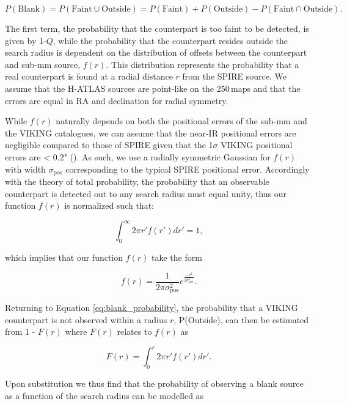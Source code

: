 \begin{equation}
\label{eq:blank_probability}
    P(\textrm{Blank}) = P(\textrm{Faint} \cup \textrm{Outside}) = P(\textrm{Faint}) + P(\textrm{Outside}) - P(\textrm{Faint} \cap \textrm{Outside}).
\end{equation}

The first term, the probability that the counterpart is too faint to be detected, is given by 1-$Q$, while the probability that the counterpart resides outside the search radius is dependent on the distribution of offsets between the counterpart and sub-mm source, $f(r)$. This distribution represents the probability that a real counterpart is found at a radial distance $r$ from the SPIRE source. We assume that the H-ATLAS sources are point-like on the 250\,\micron maps and that the errors are equal in RA and declination for radial symmetry.

While $f(r)$ naturally depends on both the positional errors of the sub-mm and the VIKING catalogues, we can assume that the near-IR positional errors are negligible compared to those of SPIRE given that the 1$\sigma$ VIKING positional errors are < 0.2" (\citealt{Fleuren_2012}). As such, we use a radially symmetric Gaussian for $f(r)$ with width $\sigma_\textrm{pos}$ corresponding to the typical SPIRE positional error. Accordingly with the theory of total probability, the probability that an observable counterpart is detected out to any search radius must equal unity, thus our function $f(r)$ is normalized such that:

\begin{equation}
    \int_0^\infty 2\pi r'f(r')dr' = 1,
\end{equation}

which implies that our function $f(r)$ take the form

\begin{equation}
    f(r) = \frac{1}{2\pi\sigma_\textrm{pos}^2}e^{\frac{-r^2}{2\sigma_\textrm{pos}^2}}.
\label{eq:positional_offset_distribution}
\end{equation}

Returning to Equation \ref{eq:blank_probability}, the probability that a VIKING counterpart is not observed within a radius $r$, P(Outside), can then be estimated from 1 - $F(r)$ where $F(r)$ relates to $f(r)$ as

\begin{equation}
    F(r) = \int_0^r 2\pi r'f(r')dr'.
\end{equation}

Upon substitution we thus find that the probability of observing a blank source as a function of the search radius can be modelled as

